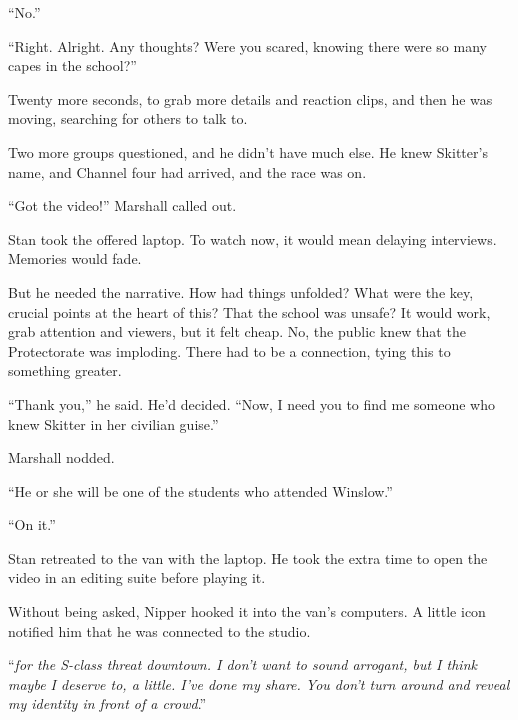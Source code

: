 ``No.''



``Right.  Alright.  Any thoughts?  Were you scared, knowing there were so many capes in the school?''



Twenty more seconds, to grab more details and reaction clips, and then he was moving, searching for others to talk to.



Two more groups questioned, and he didn't have much else.  He knew Skitter's name, and Channel four had arrived, and the race was on.



``Got the video!'' Marshall called out.



Stan took the offered laptop.  To watch now, it would mean delaying interviews.  Memories would fade.



But he needed the narrative.  How had things unfolded?  What were the key, crucial points at the heart of this?  That the school was unsafe?  It would work, grab attention and viewers, but it felt cheap.  No, the public knew that the Protectorate was imploding.  There had to be a connection, tying this to something greater.



``Thank you,'' he said.  He'd decided.  ``Now, I need you to find me someone who knew Skitter in her civilian guise.''



Marshall nodded.



``He or she will be one of the students who attended Winslow.''



``On it.''



Stan retreated to the van with the laptop.  He took the extra time to open the video in an editing suite before playing it.



Without being asked, Nipper hooked it into the van's computers.  A little icon notified him that he was connected to the studio.



``\emph{\ldotsThere for the S-class threat downtown.  I don't want to sound arrogant, but I think maybe I deserve to, a little.  I've done my share.  You don't turn around and reveal my identity in front of a crowd}.''



